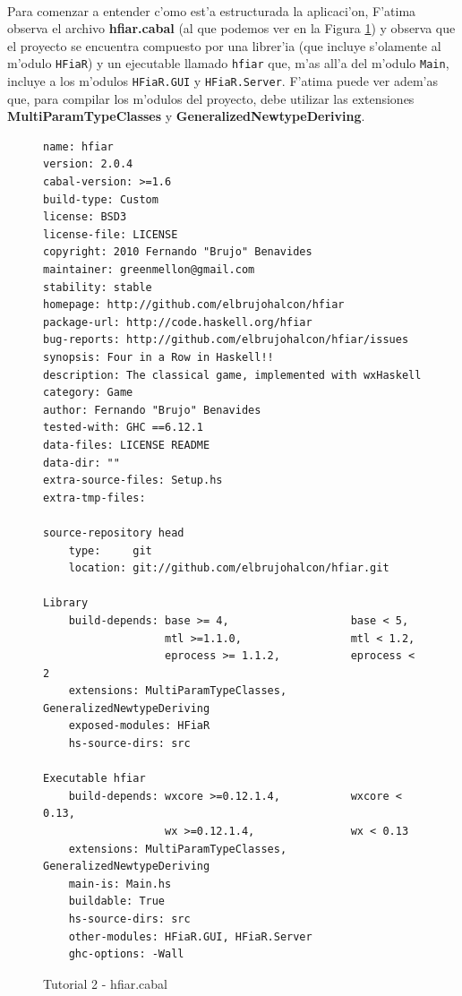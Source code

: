 \documentclass[a4paper]{article}
\begin{document}
\paragraph{}Para comenzar a entender c'omo est'a estructurada la aplicaci'on, F'atima observa el archivo \textbf{hfiar.cabal} (al que podemos ver en la Figura \ref{tut201}) y observa que el proyecto se encuentra compuesto por una librer'ia (que incluye s'olamente al m'odulo \texttt{HFiaR}) y un ejecutable llamado \texttt{hfiar} que, m'as all'a del m'odulo \texttt{Main}, incluye a los m'odulos \texttt{HFiaR.GUI} y \texttt{HFiaR.Server}.  F'atima puede ver adem'as que, para compilar los m'odulos del proyecto, debe utilizar las extensiones \textbf{MultiParamTypeClasses} y \textbf{GeneralizedNewtypeDeriving}.
\begin{figure}[hp]
	\begin{center}
	\hbox{}
		\begin{center}\begin{lstlisting}
name: hfiar
version: 2.0.4
cabal-version: >=1.6
build-type: Custom
license: BSD3
license-file: LICENSE
copyright: 2010 Fernando "Brujo" Benavides
maintainer: greenmellon@gmail.com
stability: stable
homepage: http://github.com/elbrujohalcon/hfiar
package-url: http://code.haskell.org/hfiar
bug-reports: http://github.com/elbrujohalcon/hfiar/issues
synopsis: Four in a Row in Haskell!!
description: The classical game, implemented with wxHaskell
category: Game
author: Fernando "Brujo" Benavides
tested-with: GHC ==6.12.1
data-files: LICENSE README
data-dir: ""
extra-source-files: Setup.hs
extra-tmp-files:

source-repository head
    type:     git
    location: git://github.com/elbrujohalcon/hfiar.git

Library
    build-depends: base >= 4,                   base < 5,
                   mtl >=1.1.0,                 mtl < 1.2,
                   eprocess >= 1.1.2,           eprocess < 2
    extensions: MultiParamTypeClasses, GeneralizedNewtypeDeriving
    exposed-modules: HFiaR
    hs-source-dirs: src

Executable hfiar
    build-depends: wxcore >=0.12.1.4,           wxcore < 0.13,
                   wx >=0.12.1.4,               wx < 0.13
    extensions: MultiParamTypeClasses, GeneralizedNewtypeDeriving
    main-is: Main.hs
    buildable: True
    hs-source-dirs: src
    other-modules: HFiaR.GUI, HFiaR.Server
    ghc-options: -Wall
    			\end{lstlisting}\end{center}
		\caption{Tutorial 2 - hfiar.cabal}
		\label{tut201}
	\end{center}
\end{figure}
\end{document}
